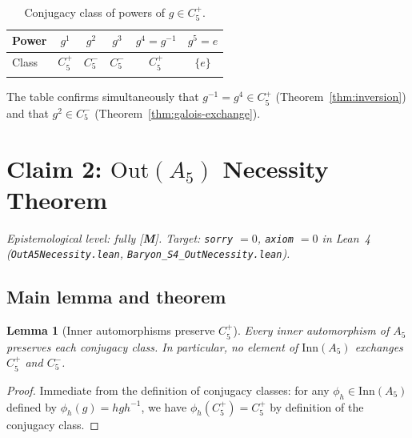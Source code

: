 \documentclass[sn-mathphys-num,Numbered]{sn-jnl}
\theoremstyle{thmstyleone}
\newtheorem{lemma}[theorem]{Lemma}
\theoremstyle{thmstylethree}
\theoremstyle{thmstyletwo}
\newcommand{\tagM}{[\textbf{M}]}
\begin{document}
\begin{table}[h]
\caption{Conjugacy class of powers of $g \in C_5^+$.}
\label{tab:powers}
\begin{tabular}{@{}lccccc@{}}
\toprule
Power & $g^1$ & $g^2$ & $g^3$ & $g^4 = g^{-1}$ & $g^5 = e$ \\
\midrule
Class & $C_5^+$ & $C_5^-$ & $C_5^-$ & $C_5^+$ & $\{e\}$ \\
\botrule
\end{tabular}
\end{table}

The table confirms simultaneously that $g^{-1} = g^4 \in C_5^+$
(Theorem~\ref{thm:inversion}) and that $g^2 \in C_5^-$
(Theorem~\ref{thm:galois-exchange}).
\section{Claim 2: \texorpdfstring{$\mathrm{Out}(A_5)$}{Out(A5)}
  Necessity Theorem}
\label{sec:claim2}

\noindent\textit{Epistemological level: fully \tagM.
Target: \texttt{sorry} $= 0$, \texttt{axiom} $= 0$ in Lean~4
\textup{(}\texttt{OutA5Necessity.lean},
\texttt{Baryon\_\allowbreak S4\_\allowbreak OutNecessity.lean}\textup{)}.}

\bigskip

\subsection{Main lemma and theorem}
\label{ssec:claim2-main}

\begin{lemma}[Inner automorphisms preserve $C_5^+$]
\label{lem:inner-preserve}
Every inner automorphism of $A_5$ preserves each conjugacy class.  In
particular, no element of $\mathrm{Inn}(A_5)$ exchanges $C_5^+$ and
$C_5^-$.
\end{lemma}

\begin{proof}
Immediate from the definition of conjugacy classes: for any $\phi_h \in
\mathrm{Inn}(A_5)$ defined by $\phi_h(g) = hgh^{-1}$, we have
$\phi_h(C_5^+) = C_5^+$ by definition of the conjugacy class.
\end{proof}
\end{document}
